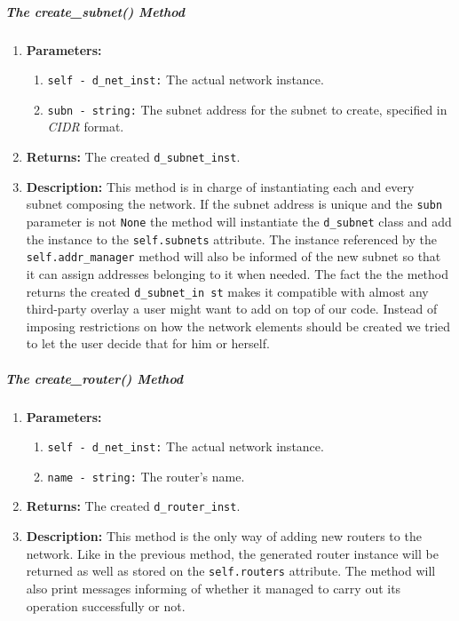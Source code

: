         \subparagraph{The create\_subnet() Method}
            \begin{enumerate}
                \item \textbf{Parameters:}
                \begin{enumerate}
                    \item \texttt{self - d\_net\_inst:} The actual network instance.
                    \item \texttt{subn - string:} The subnet address for the subnet to create, specified in \textit{CIDR} format.
                \end{enumerate}
                \item \textbf{Returns:} The created \texttt{d\_subnet\_inst}.
                \item \textbf{Description:} This method is in charge of instantiating each and every subnet composing the network. If the subnet address is unique and the \texttt{subn} parameter is not \texttt{None} the method will instantiate the \texttt{d\_subnet} class and add the instance to the \texttt{self.subnets} attribute. The instance referenced by the \texttt{self.addr\_manager} method will also be informed of the new subnet so that it can assign addresses belonging to it when needed. The fact the the method returns the created \texttt{d\_subnet\_in st} makes it compatible with almost any third-party overlay a user might want to add on top of our code. Instead of imposing restrictions on how the network elements should be created we tried to let the user decide that for him or herself.
            \end{enumerate}

        \subparagraph{The create\_router() Method}
            \begin{enumerate}
                \item \textbf{Parameters:}
                \begin{enumerate}
                    \item \texttt{self - d\_net\_inst:} The actual network instance.
                    \item \texttt{name - string:} The router's name.
                \end{enumerate}
                \item \textbf{Returns:} The created \texttt{d\_router\_inst}.
                \item \textbf{Description:} This method is the only way of adding new routers to the network. Like in the previous method, the generated router instance will be returned as well as stored on the \texttt{self.routers} attribute. The method will also print messages informing of whether it managed to carry out its operation successfully or not.
            \end{enumerate}

